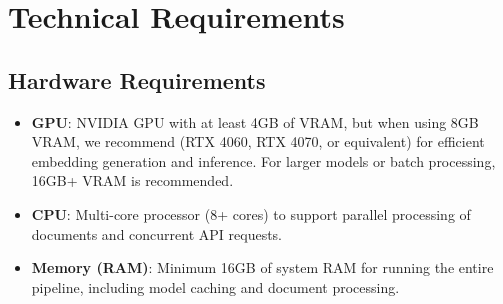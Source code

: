

\section{Technical Requirements}

\subsection{Hardware Requirements}

\begin{itemize}
    \item \textbf{GPU}: NVIDIA GPU with at least 4GB of VRAM, but when using 8GB VRAM, we recommend (RTX 4060, RTX 4070, or equivalent) for efficient embedding generation and inference. For larger models or batch processing, 16GB+ VRAM is recommended.
    \item \textbf{CPU}: Multi-core processor (8+ cores) to support parallel processing of documents and concurrent API requests.
    \item \textbf{Memory (RAM)}: Minimum 16GB of system RAM for running the entire pipeline, including model caching and document processing.
\end{itemize}

